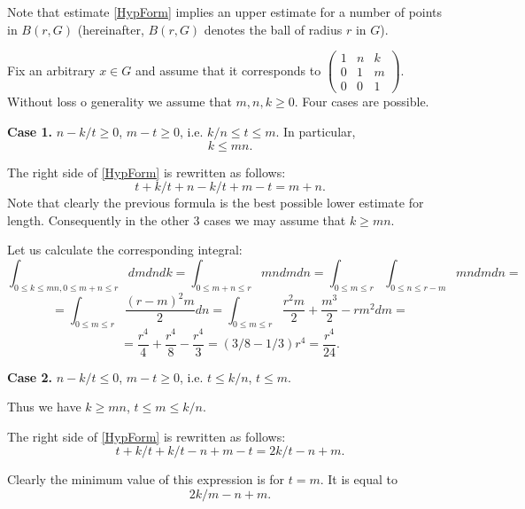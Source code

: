 \documentclass[11pt]{article}
\theoremstyle{Mystyle}
\begin{document}
Note that estimate \eqref{HypForm} implies an upper estimate for a number of points in $B(r,G)$ (hereinafter, $B(r,G)$ denotes the ball of radius $r$ in $G$).

Fix an arbitrary $x\in G$ and assume that it corresponds to $\left(\begin{array}{ccc} 1& n & k\\ 0 & 1 & m\\ 0 & 0 & 1 \end{array}\right)$. 
Without loss o generality we assume that $m,n,k\geq0$.
Four cases are possible.

\textbf{Case 1.} $n - k/t\geq 0$, $m-t\geq0$, i.e. $k/n\leq t\leq m$. In particular, 
$$k\leq mn.$$

The right side of \eqref{HypForm} is rewritten as follows:
$$t+k/t + n-k/t+m-t = m+n.$$
Note that clearly the previous formula is the best possible lower estimate for length. Consequently in the other $3$ cases we may assume that $k\geq mn$.

Let us calculate the corresponding integral:
$$\int_{0\leq k\leq mn, 0\leq m+n\leq r}dm dn dk = \int_{0\leq m+n\leq r} mn dm dn = \int_{0\leq m\leq r}\int_{0\leq n\leq r-m} mn dm dn = $$
$$= \int_{0\leq m\leq r}  \frac{(r-m)^2 m}{2} dn = \int_{0\leq m\leq r} \frac{r^2m}{2} + \frac{m^3}{2} - rm^2 dm=$$
\begin{equation}
\label{int1} 
=\frac{r^4}{4} + \frac{r^4}{8} - \frac{r^4}{3} = (3/8 - 1/3)r^4 = \frac{r^4}{24}.
\end{equation}

\textbf{Case 2.} $n-k/t\leq 0$, $m-t\geq0$, i.e. $t\leq k/n$, $t\leq m$.

Thus we have $k\geq mn$, $t\leq m\leq k/n$.

The right side of \eqref{HypForm} is rewritten as follows:
$$t + k/t + k/t - n + m - t = 2k/t - n + m.$$

Clearly the minimum value of this expression is for $t = m$. It is equal to
$$2k/m - n + m.$$

\end{document}

